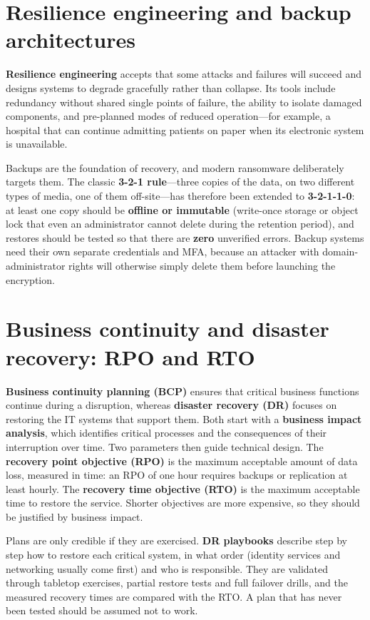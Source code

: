 \documentclass[11pt,openany]{book}
\begin{document}
\section{Resilience engineering and backup architectures}\label{sec:13.1}
\textbf{Resilience engineering} accepts that some attacks and failures will succeed and designs systems to degrade gracefully rather than collapse. Its tools include redundancy without shared single points of failure, the ability to isolate damaged components, and pre-planned modes of reduced operation—for example, a hospital that can continue admitting patients on paper when its electronic system is unavailable.

Backups are the foundation of recovery, and modern ransomware deliberately targets them. The classic \textbf{3-2-1 rule}—three copies of the data, on two different types of media, one of them off-site—has therefore been extended to \textbf{3-2-1-1-0}: at least one copy should be \textbf{offline or immutable} (write-once storage or object lock that even an administrator cannot delete during the retention period), and restores should be tested so that there are \textbf{zero} unverified errors. Backup systems need their own separate credentials and MFA, because an attacker with domain-administrator rights will otherwise simply delete them before launching the encryption.

\section{Business continuity and disaster recovery: RPO and RTO}\label{sec:13.2}
\textbf{Business continuity planning (BCP)} ensures that critical business functions continue during a disruption, whereas \textbf{disaster recovery (DR)} focuses on restoring the IT systems that support them. Both start with a \textbf{business impact analysis}, which identifies critical processes and the consequences of their interruption over time. Two parameters then guide technical design. The \textbf{recovery point objective (RPO)} is the maximum acceptable amount of data loss, measured in time: an RPO of one hour requires backups or replication at least hourly. The \textbf{recovery time objective (RTO)} is the maximum acceptable time to restore the service. Shorter objectives are more expensive, so they should be justified by business impact.

Plans are only credible if they are exercised. \textbf{DR playbooks} describe step by step how to restore each critical system, in what order (identity services and networking usually come first) and who is responsible. They are validated through tabletop exercises, partial restore tests and full failover drills, and the measured recovery times are compared with the RTO. A plan that has never been tested should be assumed not to work.
\end{document}
